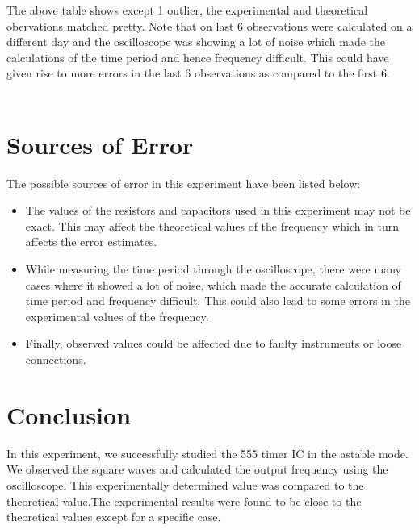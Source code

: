 \documentclass[12pt]{article}
\begin{document}
\noindent
The above table shows except 1 outlier, the experimental and theoretical obervations matched pretty. Note that on last 6 observations were calculated on a different day and the oscilloscope was showing a lot of noise which made the calculations of the time period and hence frequency difficult. This could have given rise to more errors in the last 6 observations as compared to the first 6.\\
\\

\section{Sources of Error}
The possible sources of error in this experiment have been listed below:
\begin{itemize}
  \item The values of the resistors and capacitors used in this experiment may not be exact. This may affect the theoretical values of the frequency which in turn affects the error estimates.
  \item While measuring the time period through the oscilloscope, there were many cases where it showed a lot of noise, which made the accurate calculation of time period and frequency difficult. This could also lead to some errors in the experimental values of the frequency.
  \item Finally, observed values could be affected due to faulty instruments or loose connections.
\end{itemize}

\section{Conclusion}
In this experiment, we successfully studied the 555 timer IC in the astable mode. We observed the square waves and calculated the output frequency using the oscilloscope. This experimentally determined value was compared to the theoretical value.The experimental results were found to be close to the theoretical values except for a specific case.
\end{document}
